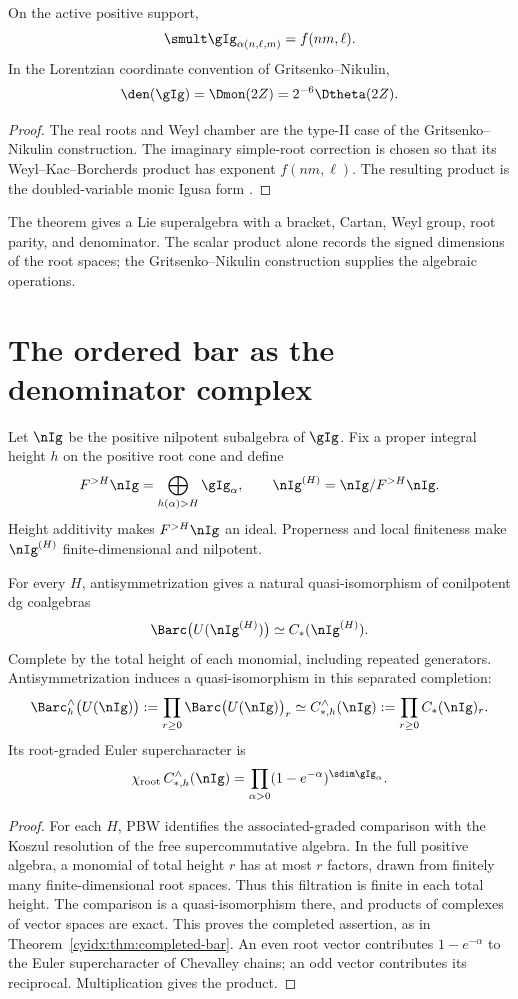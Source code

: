 \begin{theorem}
On the active positive support,
\[
 \smult\gIg_{\alpha(n,\ell,m)}=f(nm,\ell).
\]
In the Lorentzian coordinate convention of Gritsenko--Nikulin,
\[
 \den(\gIg)=\Dmon(2Z)=2^{-6}\Dtheta(2Z).
\]
\end{theorem}
\begin{proof}
The real roots and Weyl chamber are the type-II case of the Gritsenko--Nikulin construction. The imaginary simple-root correction is chosen so that its Weyl--Kac--Borcherds product has exponent $f(nm,\ell)$. The resulting product is the doubled-variable monic Igusa form \cite{GN97,GN98a,GN98b}.
\end{proof}

The theorem gives a Lie superalgebra with a bracket, Cartan, Weyl group, root parity, and denominator. The scalar product alone records the signed dimensions of the root spaces; the Gritsenko--Nikulin construction supplies the algebraic operations.

\chapter{The ordered bar as the denominator complex}
Let $\nIg$ be the positive nilpotent subalgebra of $\gIg$. Fix a proper integral height $h$ on the positive root cone and define
\[
 F^{>H}\nIg=\bigoplus_{h(\alpha)>H}\gIg_\alpha,
 \qquad
 \nIg^{(H)}=\nIg/F^{>H}\nIg.
\]
Height additivity makes $F^{>H}\nIg$ an ideal. Properness and local finiteness make $\nIg^{(H)}$ finite-dimensional and nilpotent.

\begin{theorem}
For every $H$, antisymmetrization gives a natural quasi-isomorphism of conilpotent dg coalgebras
\[
 \Barc\bigl(U(\nIg^{(H)})\bigr)\simeq C_*(\nIg^{(H)}).
\]
Complete by the total height of each monomial, including
repeated generators. Antisymmetrization induces a
quasi-isomorphism in this separated completion:
\[
 \Barc_h^\wedge\bigl(U(\nIg)\bigr)
 :=\prod_{r\ge0}\Barc\bigl(U(\nIg)\bigr)_r
 \simeq
 C_{*,h}^\wedge(\nIg)
 :=\prod_{r\ge0}C_*(\nIg)_r.
\]
Its root-graded Euler supercharacter is
\[
 \chi_{\mathrm{root}}\,C_{*,h}^\wedge(\nIg)
 =\prod_{\alpha>0}
 (1-e^{-\alpha})^{\sdim\gIg_\alpha}.
\]
\end{theorem}
\begin{proof}
For each $H$, PBW identifies the associated-graded comparison
with the Koszul resolution of the free supercommutative
algebra. In the full positive algebra, a monomial of total
height $r$ has at most $r$ factors, drawn from finitely many
finite-dimensional root spaces. Thus this filtration is
finite in each total height. The comparison is a
quasi-isomorphism there, and products of complexes of vector
spaces are exact. This proves the completed assertion,
as in Theorem~\ref{cyidx:thm:completed-bar}.
An even root vector contributes $1-e^{-\alpha}$ to the
Euler supercharacter of Chevalley chains; an odd vector
contributes its reciprocal. Multiplication gives the product.
\end{proof}

